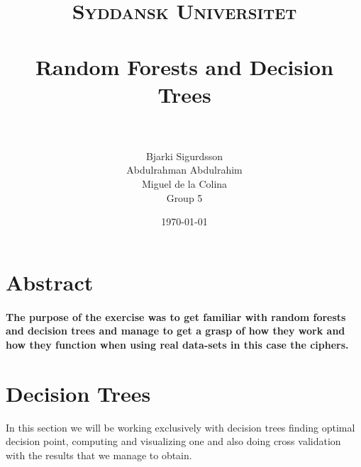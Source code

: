 \documentclass[paper=a4, fontsize=11pt]{scrartcl} %
\title{	
\normalfont \normalsize 
\textsc{Syddansk Universitet} \\ [25pt] 
\horrule{0.5pt} \\[0.4cm] %
\huge Random Forests and Decision Trees \\ %
\horrule{2pt} \\[0.5cm] %
}
\author{Bjarki Sigurdsson \\ Abdulrahman Abdulrahim \\ Miguel de la Colina \\ Group 5}
\date{\normalsize\today} %
\begin{document}
\maketitle %



\section*{Abstract}

\paragraph{The purpose of the exercise was to get familiar with random forests and decision trees and manage to get a grasp of how they work and how they function when using real data-sets in this case the ciphers.}




\section{Decision Trees}
In this section we will be working exclusively with decision trees finding optimal decision point, computing and visualizing one and also doing cross validation with the results that we manage to obtain. 
\end{document}

